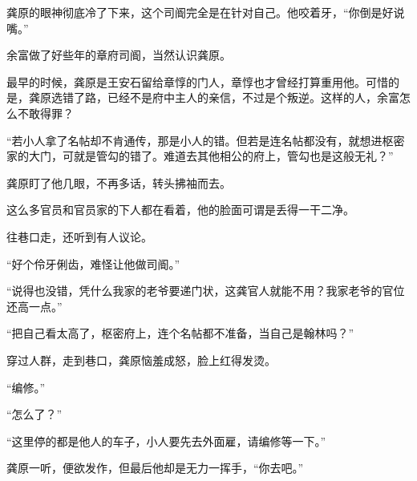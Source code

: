 龚原的眼神彻底冷了下来，这个司阍完全是在针对自己。他咬着牙，“你倒是好说嘴。”

余富做了好些年的章府司阍，当然认识龚原。

最早的时候，龚原是王安石留给章惇的门人，章惇也才曾经打算重用他。可惜的是，龚原选错了路，已经不是府中主人的亲信，不过是个叛逆。这样的人，余富怎么不敢得罪？

“若小人拿了名帖却不肯通传，那是小人的错。但若是连名帖都没有，就想进枢密家的大门，可就是管勾的错了。难道去其他相公的府上，管勾也是这般无礼？”

龚原盯了他几眼，不再多话，转头拂袖而去。

这么多官员和官员家的下人都在看着，他的脸面可谓是丢得一干二净。

往巷口走，还听到有人议论。

“好个伶牙俐齿，难怪让他做司阍。”

“说得也没错，凭什么我家的老爷要递门状，这龚官人就能不用？我家老爷的官位还高一点。”

“把自己看太高了，枢密府上，连个名帖都不准备，当自己是翰林吗？”

穿过人群，走到巷口，龚原恼羞成怒，脸上红得发烫。

“编修。”

“怎么了？”

“这里停的都是他人的车子，小人要先去外面雇，请编修等一下。”

龚原一听，便欲发作，但最后他却是无力一挥手，“你去吧。”
